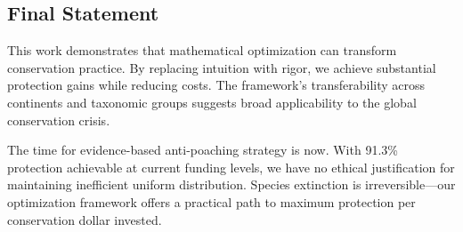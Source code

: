 \subsection{Final Statement}

This work demonstrates that mathematical optimization can transform conservation practice. By replacing intuition with rigor, we achieve substantial protection gains while reducing costs. The framework's transferability across continents and taxonomic groups suggests broad applicability to the global conservation crisis.

The time for evidence-based anti-poaching strategy is now. With 91.3\% protection achievable at current funding levels, we have no ethical justification for maintaining inefficient uniform distribution. Species extinction is irreversible—our optimization framework offers a practical path to maximum protection per conservation dollar invested.
